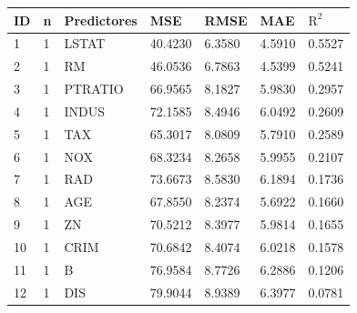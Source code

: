 \documentclass[11pt, letterpaper]{article}
\begin{document}
\begin{table}[h!] %
\centering
\begin{adjustbox}{width=\textwidth}
\begin{tabular}{lllllll}
\hline
\textbf{ID} & \textbf{n} & \textbf{Predictores}                                      & \textbf{MSE} & \textbf{RMSE} & \textbf{MAE} & \textbf{$\mathrm{R}^2$} \\ \hline
1           & 1          & LSTAT                                                     & 40.4230      & 6.3580        & 4.5910       & 0.5527         \\
2           & 1          & RM                                                        & 46.0536      & 6.7863        & 4.5399       & 0.5241         \\
3           & 1          & PTRATIO                                                   & 66.9565      & 8.1827        & 5.9830       & 0.2957         \\
4           & 1          & INDUS                                                     & 72.1585      & 8.4946        & 6.0492       & 0.2609         \\
5           & 1          & TAX                                                       & 65.3017      & 8.0809        & 5.7910       & 0.2589         \\
6           & 1          & NOX                                                       & 68.3234      & 8.2658        & 5.9955       & 0.2107         \\
7           & 1          & RAD                                                       & 73.6673      & 8.5830        & 6.1894       & 0.1736         \\
8           & 1          & AGE                                                       & 67.8550      & 8.2374        & 5.6922       & 0.1660         \\
9           & 1          & ZN                                                        & 70.5212      & 8.3977        & 5.9814       & 0.1655         \\
10          & 1          & CRIM                                                      & 70.6842      & 8.4074        & 6.0218       & 0.1578         \\
11          & 1          & B                                                         & 76.9584      & 8.7726        & 6.2886       & 0.1206         \\
12          & 1          & DIS                                                       & 79.9044      & 8.9389        & 6.3977       & 0.0781         \\

\end{tabular}
\end{adjustbox}
\end{table}
\end{document}
